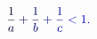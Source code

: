 \documentclass[12pt]{article}
\begin{document}
\makeatletter
\renewcommand*{\@textcolor}[3]{%
  \protect\leavevmode
  \begingroup
    \color#1{#2}#3%
  \endgroup
}
\makeatother
\begin{displaymath}
\mathcolor[RGB]{0,0,15}{\frac { \mathcolor[RGB]{0,0,30}{1} } { \mathcolor[RGB]{0,0,45}{a} } } \mathcolor[RGB]{0,0,60}{+} \mathcolor[RGB]{0,0,75}{\frac { \mathcolor[RGB]{0,0,90}{1} } { \mathcolor[RGB]{0,0,105}{b} } } \mathcolor[RGB]{0,0,120}{+} \mathcolor[RGB]{0,0,135}{\frac { \mathcolor[RGB]{0,0,150}{1} } { \mathcolor[RGB]{0,0,165}{c} } } \mathcolor[RGB]{0,0,180}{<} \mathcolor[RGB]{0,0,195}{1} \mathcolor[RGB]{0,0,210}{.}
\end{displaymath}
\end{document}
